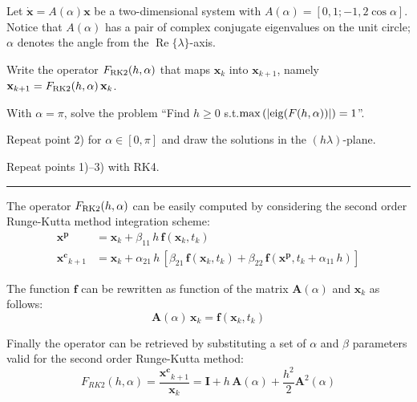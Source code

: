\documentclass[11pt,a4paper,oneside]{article}
\renewcommand{\vec}[1]{\mathbf{#1}}
\begin{document}
Let $\dot{\vec x} = A(\alpha) \vec x$ be a two-dimensional system with $A(\alpha) = [0, 1; -1, 2\cos\alpha]$.
Notice that $A(\alpha)$ has a pair of complex conjugate eigenvalues on the unit circle; $\alpha$ denotes the angle from the $\operatorname{Re}\{\lambda\}$-axis. 
\begin{enumerate*}[label=\arabic*)]
    \item Write the operator $F_{\rm RK2}(h,\alpha)$ that maps $\vec x_k$ into $\vec x_{k+1}$, namely $\vec x_{k+1} = F_{\rm RK2}(h,\alpha) \, \vec x_k$.
    \item\!With $\alpha = \pi$, solve the problem ``Find $h\ge 0$ s.t.$\max\left(|{\rm eig}(F(h,\alpha))|\right) = 1$''.
    \item Repeat point 2) for $\alpha\in[0, \pi]$ and draw the solutions in the $(h\lambda)$-plane.
    \item Repeat points 1)--3) with RK4.
\end{enumerate*}

\medskip \hrule \medskip

The operator $F_{\rm RK2}(h,\alpha)$ can be easily computed by considering the second order Runge-Kutta method integration scheme:
\begin{subequations}
    \begin{align}
        \vec{x^p} &= \vec{x}_k + \beta_{11}\,h\, \vec{f}\left(\vec{x}_k, t_k\right) \label{eq:ex3_xp}\\
        \vec{x^c}_{k+1} &= \vec{x}_k + \alpha_{21}\, h\, \left[ \beta_{21}\, \vec{f}\left(\vec{x}_k, t_k\right) + \beta_{22}\, \vec{f}\left(\vec{x^p}, t_k+\alpha_{11}\, h\right) \right] \label{eq:ex3_xc}
    \end{align}
\end{subequations}

The function $\vec{f}$ can be rewritten as function of the matrix $\vec{A}(\alpha)$ and $\vec{x}_k$ as follows:
\begin{equation}
    \vec{A}(\alpha)\, \vec{x}_k = \vec{f}\left(\vec{x}_k, t_k\right)
    \label{eq:ex3_defineF}
\end{equation}

Finally the operator can be retrieved by substituting a set of $\alpha$ and $\beta$ parameters valid for the second order Runge-Kutta method:
\begin{equation} 
    F_{RK2}(h,\alpha) = \frac{\vec{x^c}_{k+1}}{\vec{x}_k} = \vec{I} + h\, \vec{A}(\alpha) + \frac{h^2}{2} \vec{A}^2(\alpha)
    \label{eq:ex3_operatorRK2}
\end{equation}
\end{document}
